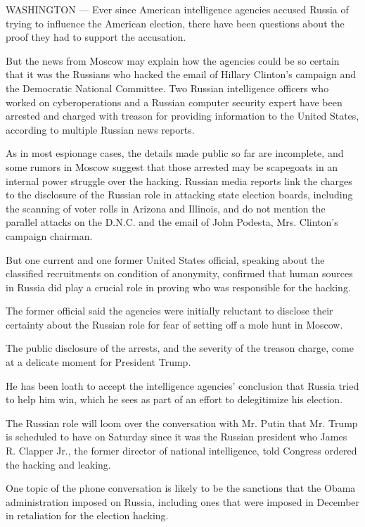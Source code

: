 WASHINGTON --- Ever since American intelligence agencies accused Russia
of trying to influence the American election, there have been questions
about the proof they had to support the accusation.

But the news from Moscow may explain how the agencies could be so
certain that it was the Russians who hacked the email of Hillary
Clinton's campaign and the Democratic National Committee. Two Russian
intelligence officers who worked on cyberoperations and a Russian
computer security expert have been arrested and charged with treason for
providing information to the United States, according to multiple
Russian news reports.

As in most espionage cases, the details made public so far are
incomplete, and some rumors in Moscow suggest that those arrested may be
scapegoats in an internal power struggle over the hacking. Russian media
reports link the charges to the disclosure of the Russian role in
attacking state election boards, including the scanning of voter rolls
in Arizona and Illinois, and do not mention the parallel attacks on the
D.N.C. and the email of John Podesta, Mrs. Clinton's campaign chairman.

But one current and one former United States official, speaking about
the classified recruitments on condition of anonymity, confirmed that
human sources in Russia did play a crucial role in proving who was
responsible for the hacking.

The former official said the agencies were initially reluctant to
disclose their certainty about the Russian role for fear of setting off
a mole hunt in Moscow.

The public disclosure of the arrests, and the severity of the treason
charge, come at a delicate moment for President Trump.

He has been loath to accept the intelligence agencies' conclusion that
Russia tried to help him win, which he sees as part of an effort to
delegitimize his election.

The Russian role will loom over the conversation with Mr. Putin that Mr.
Trump is scheduled to have on Saturday since it was the Russian
president who James R. Clapper Jr., the former director of national
intelligence, told Congress ordered the hacking and leaking.

One topic of the phone conversation is likely to be the sanctions that
the Obama administration imposed on Russia, including ones that were
imposed in December in retaliation for the election hacking.

